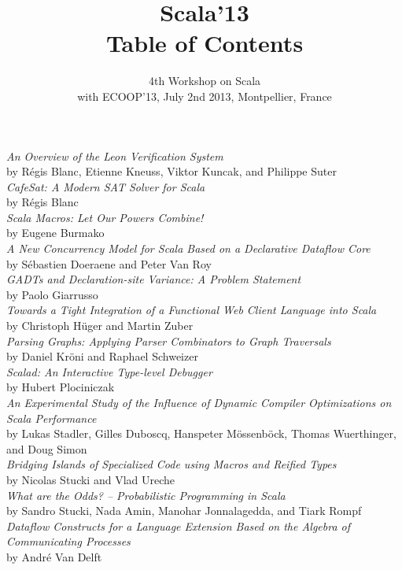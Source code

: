 \documentclass[a4paper]{scrartcl}
\title{Scala'13\\ Table of Contents}
\subtitle{4th Workshop on Scala\\
  with ECOOP'13, July 2nd 2013, Montpellier, France}
\date{}
\newcommand{\papertitle}[1]{\noindent \emph{#1}\\}
\newcommand{\paperauthor}[1]{by #1\\[2em]}
\begin{document}
\thispagestyle{empty}

\maketitle

\papertitle{An Overview of the Leon Verification System}
\paperauthor{R\'{e}gis Blanc, Etienne Kneuss, Viktor Kuncak, and Philippe Suter}

\papertitle{CafeSat: A Modern SAT Solver for Scala}
\paperauthor{R\'{e}gis Blanc}

\papertitle{Scala Macros: Let Our Powers Combine!}
\paperauthor{Eugene Burmako}

\papertitle{A New Concurrency Model for Scala Based on a Declarative Dataflow Core}
\paperauthor{S\'{e}bastien Doeraene and Peter Van Roy}

\papertitle{GADTs and Declaration-site Variance: A Problem Statement}
\paperauthor{Paolo Giarrusso}

\papertitle{Towards a Tight Integration of a Functional Web Client Language into Scala}
\paperauthor{Christoph H\"{u}ger and Martin Zuber}

\papertitle{Parsing Graphs: Applying Parser Combinators to Graph Traversals}
\paperauthor{Daniel Kr\"{o}ni and Raphael Schweizer}

\papertitle{Scalad: An Interactive Type-level Debugger}
\paperauthor{Hubert Plociniczak}

\papertitle{An Experimental Study of the Influence of Dynamic Compiler Optimizations on Scala Performance}
\paperauthor{Lukas Stadler, Gilles Duboscq, Hanspeter M\"{o}ssenb\"{o}ck, Thomas Wuerthinger, and Doug Simon}

\papertitle{Bridging Islands of Specialized Code using Macros and Reified Types}
\paperauthor{Nicolas Stucki and Vlad Ureche}

\papertitle{What are the Odds? -- Probabilistic Programming in Scala}
\paperauthor{Sandro Stucki, Nada Amin, Manohar Jonnalagedda, and Tiark Rompf}

\papertitle{Dataflow Constructs for a Language Extension Based on the Algebra of Communicating Processes}
\paperauthor{Andr\'{e} Van Delft}
\end{document}

